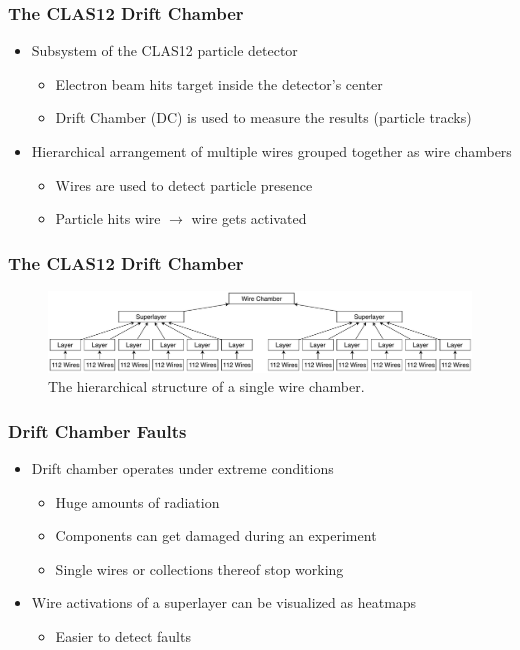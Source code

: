 \begin{frame}
  \frametitle{The CLAS12 Drift Chamber}
  \begin{itemize}
    \item Subsystem of the CLAS12 particle detector
      \begin{itemize}
        \item Electron beam hits target inside the detector's center
        \item Drift Chamber (DC) is used to measure the results
          (particle tracks)
      \end{itemize}
    \item Hierarchical arrangement of multiple wires grouped together
      as wire chambers
      \begin{itemize}
        \item Wires are used to detect particle presence
        \item Particle hits wire \(\rightarrow\) wire gets activated
      \end{itemize}
  \end{itemize}
\end{frame}

\begin{frame}
  \frametitle{The CLAS12 Drift Chamber}
  \begin{figure}
    \includegraphics[width=\textwidth]{../figures/wire_chamber}
    \caption{The hierarchical structure of a single wire chamber.}
  \end{figure}
\end{frame}

\begin{frame}
  \frametitle{Drift Chamber Faults}
  \begin{itemize}
    \item Drift chamber operates under extreme conditions
      \begin{itemize}
        \item Huge amounts of radiation
        \item Components can get damaged during an experiment
        \item Single wires or collections thereof stop working
      \end{itemize}
    \item Wire activations of a superlayer can be visualized as
      heatmaps
      \begin{itemize}
        \item Easier to detect faults
      \end{itemize}
  \end{itemize}
\end{frame}

